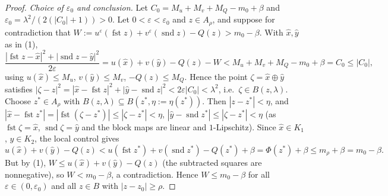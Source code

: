 \begin{proof}
\emph{Choice of $\varepsilon_0$ and conclusion.} Let $C_0=M_u+M_v+M_Q-m_0+\beta$ and $\varepsilon_0=\lambda^2/(2(|C_0|+1))>0$. Let $0<\varepsilon<\varepsilon_0$ and $z\in A_\rho$, and suppose for contradiction that $W:=u^\varepsilon(\operatorname{fst}z)+v^\varepsilon(\operatorname{snd}z)-Q(z)>m_0-\beta$. With $\hat x,\hat y$ as in (1),
\[
\frac{|\operatorname{fst}z-\hat x|^2+|\operatorname{snd}z-\hat y|^2}{2\varepsilon}=u(\hat x)+v(\hat y)-Q(z)-W<M_u+M_v+M_Q-m_0+\beta=C_0\le|C_0| ,
\]
using $u(\hat x)\le M_u$, $v(\hat y)\le M_v$, $-Q(z)\le M_Q$. Hence the point $\zeta=\hat x\oplus\hat y$ satisfies $|\zeta-z|^2=|\hat x-\operatorname{fst}z|^2+|\hat y-\operatorname{snd}z|^2<2\varepsilon|C_0|<\lambda^2$, i.e.\ $\zeta\in B(z,\lambda)$. Choose $z^*\in A_\rho$ with $B(z,\lambda)\subseteq B(z^*,\eta:=\eta(z^*))$. Then $|z-z^*|<\eta$, and $|\hat x-\operatorname{fst}z^*|=|\operatorname{fst}(\zeta-z^*)|\le|\zeta-z^*|<\eta$, $|\hat y-\operatorname{snd}z^*|\le|\zeta-z^*|<\eta$ (as $\operatorname{fst}\zeta=\hat x$, $\operatorname{snd}\zeta=\hat y$ and the block maps are linear and $1$-Lipschitz). Since $\hat x\in K_1$, $\hat y\in K_2$, the local control gives
\[
u(\hat x)+v(\hat y)-Q(z)<u(\operatorname{fst}z^*)+v(\operatorname{snd}z^*)-Q(z^*)+\beta=\Phi(z^*)+\beta\le m_\rho+\beta=m_0-\beta .
\]
But by (1), $W\le u(\hat x)+v(\hat y)-Q(z)$ (the subtracted squares are nonnegative), so $W<m_0-\beta$, a contradiction. Hence $W\le m_0-\beta$ for all $\varepsilon\in(0,\varepsilon_0)$ and all $z\in B$ with $|z-z_0|\ge\rho$.
\end{proof}
